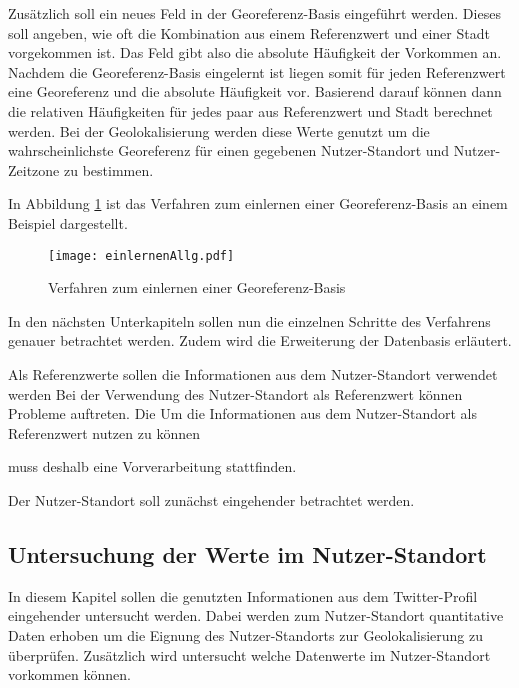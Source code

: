 		Zusätzlich soll ein neues Feld in der Georeferenz-Basis eingeführt werden.
		Dieses soll angeben, wie oft die Kombination aus einem Referenzwert und einer Stadt vorgekommen ist. 
		Das Feld gibt also die absolute Häufigkeit der Vorkommen an.
		Nachdem die Georeferenz-Basis eingelernt ist liegen somit für jeden Referenzwert eine Georeferenz und die absolute Häufigkeit vor.
		Basierend darauf können dann die relativen Häufigkeiten für jedes paar aus Referenzwert und Stadt berechnet werden.
		Bei der Geolokalisierung werden diese Werte genutzt um die wahrscheinlichste Georeferenz für einen gegebenen Nutzer-Standort und Nutzer-Zeitzone zu bestimmen.

		In Abbildung \ref{img:EinlernenAllg} ist das Verfahren zum einlernen einer Georeferenz-Basis an einem Beispiel dargestellt.

		\begin{figure}[!ht]
				\begin{center}
					\texttt{[image: einlernenAllg.pdf]}
					\caption{Verfahren zum einlernen einer Georeferenz-Basis}
					\label{img:EinlernenAllg}
				\end{center}
		\end{figure}	

		In den nächsten Unterkapiteln sollen nun die einzelnen Schritte des Verfahrens genauer betrachtet werden. 
		Zudem wird die Erweiterung der Datenbasis erläutert.
           
		Als Referenzwerte sollen die Informationen aus dem Nutzer-Standort verwendet werden 
		Bei der Verwendung des Nutzer-Standort als Referenzwert können Probleme auftreten. 
		Die 
		Um die Informationen aus dem Nutzer-Standort als Referenzwert nutzen zu können 

		muss deshalb eine Vorverarbeitung stattfinden. 

		Der Nutzer-Standort soll zunächst eingehender betrachtet werden.

		\subsection{Untersuchung der Werte im Nutzer-Standort}

			In diesem Kapitel sollen die genutzten Informationen aus dem Twitter-Profil eingehender untersucht werden.
			Dabei werden zum Nutzer-Standort quantitative Daten erhoben um die Eignung des Nutzer-Standorts zur Geolokalisierung zu überprüfen.
			Zusätzlich wird untersucht welche Datenwerte im Nutzer-Standort vorkommen können.

